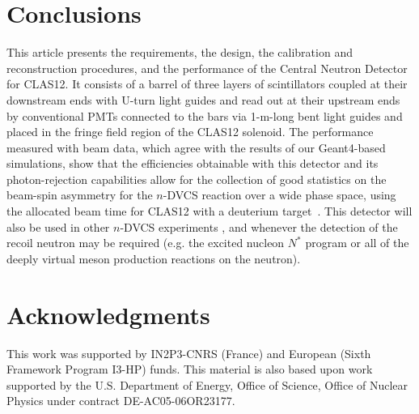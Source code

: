 \section{Conclusions}

This article presents the requirements, the design, the calibration and reconstruction procedures, and the performance of the Central Neutron Detector for CLAS12. It consists of a barrel of three layers of scintillators coupled at their downstream ends with U-turn light guides and read out at their upstream ends by conventional PMTs connected to the bars via 1-m-long bent light guides and placed in the fringe field region of the CLAS12 solenoid. 
The performance measured with beam data, which agree with the results of our Geant4-based simulations, show that the efficiencies obtainable with this detector and its photon-rejection capabilities allow for the collection of good statistics on the beam-spin asymmetry for the $n$-DVCS reaction over a wide phase space, using the allocated beam time for CLAS12 with a deuterium target~\cite{Jlab12_CLAS_n}. This detector will also be used in other $n$-DVCS experiments \cite{Jlab12_CLAS_n_pol}, and whenever the detection of the recoil neutron may be required (e.g. the excited nucleon $N^*$ program
or all of the deeply virtual meson production reactions on the neutron). 

\section{Acknowledgments}

This work was supported by IN2P3-CNRS (France) and European (Sixth Framework Program I3-HP) funds. This material is also based upon work supported by the U.S. Department of Energy, Office of Science, Office of Nuclear Physics under contract DE-AC05-06OR23177.




